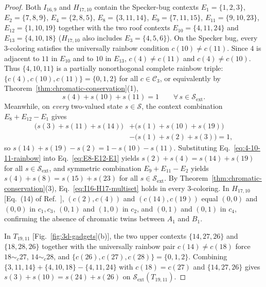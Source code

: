 \documentclass[aps,pra,reprint,superscriptaddress,longbibliography,nofootinbib,floatfix,10pt]{revtex4-2}
\theoremstyle{definition}\newtheorem{definition}[theorem]{Definition}
\theoremstyle{remark}\newtheorem{remark}[theorem]{Remark}
\newcommand{\Sc}{\mathcal S}\newcommand{\Cc}{\mathcal C}\newcommand{\Wc}{\mathcal W}
\begin{document}
\begin{proof}
Both $I_{16,9}$ and $H_{17,10}$ contain the Specker-bug contexts $E_1=\{1,2,3\}$, $E_2=\{7,8,9\}$, $E_4=\{2,8,5\}$, $E_8=\{3,11,14\}$, $E_9=\{7,11,15\}$, $E_{11}=\{9,10,23\}$, $E_{12}=\{1,10,19\}$ together with the two roof contexts $E_{10}=\{4,11,24\}$ and $E_{13}=\{4,10,18\}$ ($H_{17,10}$ also includes $E_3=\{4,5,6\}$). On the Specker bug, every $3$-coloring satisfies the universally rainbow condition $c(10)\neq c(11)$. Since $4$ is adjacent to $11$ in $E_{10}$ and to $10$ in $E_{13}$, $c(4)\neq c(11)$ and $c(4)\neq c(10)$. Thus $\{4,10,11\}$ is a partially nonorthogonal complete rainbow triple: $\{c(4),c(10),c(11)\}=\{0,1,2\}$ for all $c\in\Cc_3$, or equivalently by Theorem~\ref{thm:chromatic-conservation}(1),
\begin{equation}\label{eq:4-10-11-rainbow}
s(4)+s(10)+s(11)=1 \qquad \forall\, s\in\Sc_{\mathrm{ext}}.
\end{equation}
Meanwhile, on \emph{every} two-valued state $s\in\Sc$, the context combination $E_8+E_{12}-E_1$ gives
\begin{equation}\label{eq:E8-E12-E1}
\begin{aligned}
\bigl(s(3)+s(11)+s(14)\bigr)&+\bigl(s(1)+s(10)+s(19)\bigr)\\
&-\bigl(s(1)+s(2)+s(3)\bigr)=1,
\end{aligned}
\end{equation}
so $s(14)+s(19)-s(2)=1-s(10)-s(11)$. Substituting Eq.~\eqref{eq:4-10-11-rainbow} into Eq.~\eqref{eq:E8-E12-E1} yields $s(2)+s(4)=s(14)+s(19)$ for all $s\in\Sc_{\mathrm{ext}}$, and symmetric combination $E_9+E_{11}-E_2$ yields $s(4)+s(8)=s(15)+s(23)$ for all $s\in\Sc_{\mathrm{ext}}$. By Theorem~\ref{thm:chromatic-conservation}(3), Eq.~\eqref{eq:I16-H17-multiset} holds in every $3$-coloring. In $H_{17,10}$ [Eq.~(14) of Ref.~\cite{2026-latin-context-matrix}], $(c(2),c(4))$ and $(c(14),c(19))$ equal $(0,0)$ and $(0,0)$ in $c_1,c_3$, $(0,1)$ and $(1,0)$ in $c_2$, and $(0,1)$ and $(0,1)$ in $c_4$, confirming the absence of chromatic twins between $A_1$ and $B_1$.

In $T_{19,11}$ [Fig.~\ref{fig:3d-gadgets}(b)], the two upper contexts $\{14,27,26\}$ and $\{18,28,26\}$ together with the universally rainbow pair $c(14)\neq c(18)$ force $18\sim_c 27$, $14\sim_c 28$, and $\{c(26),c(27),c(28)\}=\{0,1,2\}$. Combining $\{3,11,14\}+\{4,10,18\}-\{4,11,24\}$ with $c(18)=c(27)$ and $\{14,27,26\}$ gives $s(3)+s(10)=s(24)+s(26)$ on $\Sc_{\mathrm{ext}}(T_{19,11})$.
\end{proof}
\end{document}
